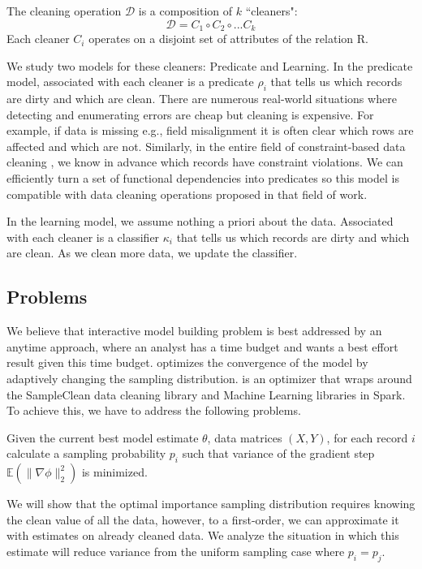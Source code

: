 The cleaning operation $\mathcal{D}$ is a composition of $k$ ``cleaners":
\[
\mathcal{D}= C_{1} \circ C_{2} \circ ... C_{k}
\]
Each cleaner $C_i$ operates on a disjoint set of attributes of the relation R.

We study two models for these cleaners: Predicate and Learning.
In the predicate model, associated with each cleaner is a predicate $\rho_i$ that 
tells us which records are dirty and which are clean.
There are numerous real-world situations where detecting and enumerating errors are cheap but cleaning is expensive.
For example, if data is missing e.g., field misalignment it is often clear which rows are affected and which are not.
Similarly, in the entire field of constraint-based data cleaning \cite{nadeef}, we know in advance which records have constraint violations.
We can efficiently turn a set of functional dependencies into predicates so this model is compatible with data cleaning operations proposed in that field of work.

In the learning model, we assume nothing a priori about the data.
Associated with each cleaner is a classifier $\kappa_i$ that 
tells us which records are dirty and which are clean.
As we clean more data, we update the classifier.

\subsection{Problems}
We believe that interactive model building problem is best addressed by an anytime approach, where an analyst has a time budget and wants a best effort result given this time budget.
\sys optimizes the convergence of the model by adaptively changing the sampling distribution.
\sys is an optimizer that wraps around the SampleClean data cleaning library and Machine Learning libraries in Spark.
To achieve this, we have to address the following problems.

\begin{problem}\label{imp-samp}\sloppy
Given the current best model estimate $\theta$, data matrices $(X,Y)$, for each record $i$ calculate a sampling probability $p_i$ such that variance of the gradient step $\mathbb{E}(\|\nabla\phi\|_{2}^{2})$ is minimized.
\end{problem}

We will show that the optimal importance sampling distribution requires knowing the clean value of all the data, however, to a first-order, we can approximate it with estimates on already cleaned data.
We analyze the situation in which this estimate will reduce variance from the uniform sampling case where $p_i = p_j$.

